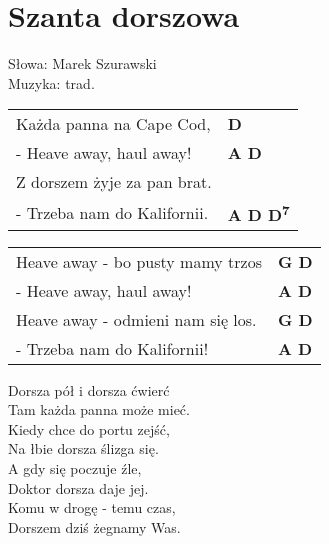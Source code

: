 \section{Szanta dorszowa}

Słowa: Marek Szurawski\\
Muzyka: trad.

\vspace{2em}
\begin{tabular}{@{}p{7cm}@{}l@{}}
Każda panna na Cape Cod, & \bfseries D\\
- Heave away, haul away! & \bfseries A D\\
Z dorszem żyje za pan brat.\\
- Trzeba nam do Kalifornii. & \bfseries A D D\textsuperscript{7}\\
\end{tabular}

\vspace{2em}
\begin{tabular}{@{}p{7cm}@{}l@{}}
Heave away - bo pusty mamy trzos & \bfseries G D\\
- Heave away, haul away! & \bfseries A D\\
Heave away - odmieni nam się los. & \bfseries G D\\
- Trzeba nam do Kalifornii! & \bfseries A D\\
\end{tabular}

\vspace{1em}
Dorsza pół i dorsza ćwierć \\
Tam każda panna może mieć. \\

Kiedy chce do portu zejść, \\
Na łbie dorsza ślizga się. \\

A gdy się poczuje źle, \\
Doktor dorsza daje jej. \\

Komu w drogę - temu czas, \\
Dorszem dziś żegnamy Was.  \\